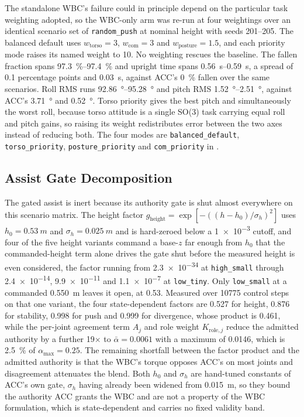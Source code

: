 \documentclass[a4paper,fleqn]{cas-dc}
\begin{document}
The standalone WBC's failure could in principle depend on the particular task
weighting adopted, so the WBC-only arm was re-run at four weightings over an
identical scenario set of \texttt{random\_push} at nominal height with seeds
201--205. The balanced default uses $w_{\text{torso}}{=}3$,
$w_{\text{com}}{=}3$ and $w_{\text{posture}}{=}1.5$, and each priority mode
raises its named weight to \num{10}. No weighting rescues the baseline. The
fallen fraction spans \SIrange{97.3}{97.4}{\percent} and upright time spans
\SIrange{0.56}{0.59}{s}, a spread of \num{0.1} percentage points and
\SI{0.03}{s}, against ACC's \SI{0}{\percent} fallen over the same scenarios.
Roll RMS runs \SIrange{92.86}{95.28}{\degree} and pitch RMS
\SIrange{1.52}{2.51}{\degree}, against ACC's \SI{3.71}{\degree} and
\SI{0.52}{\degree}. Torso priority gives the best pitch and simultaneously the
worst roll, because torso attitude is a single SO(3) task carrying equal roll
and pitch gains, so raising its weight redistributes error between the two axes
instead of reducing both. The four modes are
\texttt{balanced\_default}, \texttt{torso\_priority}, \texttt{posture\_priority}
and \texttt{com\_priority} in .

\subsection{Assist Gate Decomposition}
\label{sec:wbc_gate_decomp}

The gated assist is inert because its authority gate is shut almost everywhere
on this scenario matrix. The height factor
$g_{\text{height}} = \exp[-((h-h_0)/\sigma_h)^2]$ uses $h_0{=}\SI{0.53}{m}$ and
$\sigma_h{=}\SI{0.025}{m}$ and is hard-zeroed below a \num{1e-3} cutoff, and
four of the five height variants command a base-$z$ far enough from $h_0$ that
the commanded-height term alone drives the gate shut before the measured height
is even considered, the factor running from \num{2.3e-34} at
\texttt{high\_small} through \num{2.4e-14}, \num{9.9e-11} and \num{1.1e-7} at
\texttt{low\_tiny}. Only \texttt{low\_small} at a commanded \SI{0.550}{m} leaves
it open, at \num{0.53}. Measured over \num{10775} control steps on that one
variant, the four state-dependent factors are \num{0.527} for height,
\num{0.876} for stability, \num{0.998} for push and \num{0.999} for divergence,
whose product is \num{0.461}, while the per-joint agreement term $A_j$ and role
weight $K_{\text{role},j}$ reduce the admitted authority by a further
\num{19}$\times$ to $\bar\alpha{=}\num{0.0061}$ with a maximum of \num{0.0146},
which is \SI{2.5}{\percent} of $\alpha_{\max}{=}0.25$. The remaining shortfall
between the factor product and the admitted authority is that the WBC's torque
opposes ACC's on most joints and disagreement attenuates the blend. Both $h_0$
and $\sigma_h$ are hand-tuned constants of ACC's own gate, $\sigma_h$ having
already been widened from \SI{0.015}{m}, so they bound the authority ACC grants
the WBC and are not a property of the WBC formulation, which is state-dependent
and carries no fixed validity band.
\end{document}
